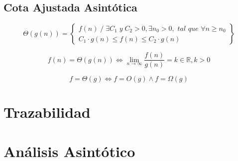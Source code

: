 \subsection{Cota Ajustada Asintótica}
$$\Theta(g(n))=\left\{\begin{matrix}
  f(n)\;/\;\exists C_1 \;y\; C_2 >0, \exists n_0>0, \textit{ tal que } \forall n \geq n_0  \\
  C_1 \cdot g(n) \leq f(n) \leq C_2 \cdot g(n)
  \end{matrix}\right\}$$

$$f(n)=\Theta(g(n)) \Leftrightarrow \lim_{n \rightarrow \infty} \frac{f(n)}{g(n)}= k \in \mathbb{R}, k > 0$$

$$f = \Theta(g) \Leftrightarrow f = O(g) \wedge f = \Omega(g) $$

\section{Trazabilidad}\label{sec:tratabilidad}


\section{Análisis Asintótico}\label{sec:análisis-asintótico}